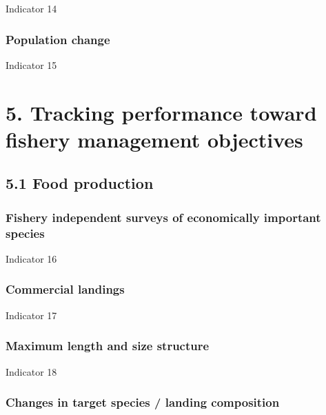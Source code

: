 \documentclass[
  letterpaper,
  oneside,
  open=any]{scrbook}
\begin{document}
Indicator 14

\hypertarget{population-change}{%
\subsection{Population change}\label{population-change}}

Indicator 15


\hypertarget{tracking-performance-toward-fishery-management-objectives}{%
\chapter{5. Tracking performance toward fishery management
objectives}\label{tracking-performance-toward-fishery-management-objectives}}

\hypertarget{food-production}{%
\section{5.1 Food production}\label{food-production}}

\hypertarget{fishery-independent-surveys-of-economically-important-species}{%
\subsection{Fishery independent surveys of economically important
species}\label{fishery-independent-surveys-of-economically-important-species}}

Indicator 16

\hypertarget{commercial-landings}{%
\subsection{Commercial landings}\label{commercial-landings}}

Indicator 17

\hypertarget{maximum-length-and-size-structure}{%
\subsection{Maximum length and size
structure}\label{maximum-length-and-size-structure}}

Indicator 18

\hypertarget{changes-in-target-species-landing-composition}{%
\subsection{Changes in target species / landing
composition}\label{changes-in-target-species-landing-composition}}
\end{document}
